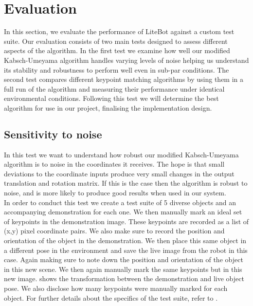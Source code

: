 \chapter{Evaluation}
\label{chap:evaluation}
In this section, we evaluate the performance of LiteBot against a custom test suite. Our evaluation consists of two main tests designed to assess different aspects of the algorithm. In the first test we examine how well our modified Kabsch-Umeyama algorithm handles varying levels of noise helping us understand its stability and robustness to perform well even in sub-par conditions. The second test compares different keypoint matching algorithms by using them in a full run of the algorithm and measuring their performance under identical environmental conditions. Following this test we will determine the best algorithm for use in our project, finalising the implementation design.

\section{Sensitivity to noise}
\label{sec:noise-test}
In this test we want to understand how robust our modified Kabsch-Umeyama algorithm is to noise in the coordinates it receives. The hope is that small deviations to the coordinate inputs produce very small changes in the output translation and rotation matrix. If this is the case then the algorithm is robust to noise, and is more likely to produce good results when used in our system.\\

In order to conduct this test we create a test suite of 5 diverse objects and an accompanying demonstration for each one. We then manually mark an ideal set of keypoints in the demonstration image. These keypoints are recorded as a list of (x,y) pixel coordinate pairs. We also make sure to record the position and orientation of the object in the demonstration. We then place this same object in a different pose in the environment and save the live image from the robot in this case. Again making sure to note down the position and orientation of the object in this new scene. We then again manually mark the same keypoints but in this new image.  shows the transformation between the demonstration and live object pose. We also disclose how many keypoints were manually marked for each object. For further details about the specifics of the test suite, refer to .\\

